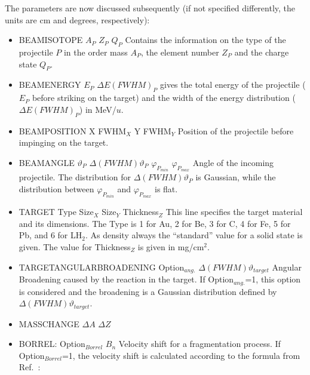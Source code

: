 \documentclass[12pt]{book}
\begin{document}
The parameters are now discussed subsequently (if not specified differently, 
the units are cm and degrees, respectively):\hfill{}
\begin{itemize}
\item BEAMISOTOPE $A_{P}$ $Z_{P}$ $Q_{P}$ \hfill{} \linebreak
  Contains the information on the type of the projectile $P$ in the order 
  mass $A_{P}$, the element number $Z_{P}$ and the charge state $Q_{P}$.
\item BEAMENERGY $E_{P}$ $\Delta E(FWHM)_{P}$\hfill{} \linebreak
  gives the total energy of the projectile 
  ( $E_{P}$ before striking on the target) 
  and the width of the energy distribution ($\Delta E(FWHM)_{P}$) in MeV/$u$.
\item BEAMPOSITION X FWHM$_{X}$ Y FWHM$_{Y}$\hfill{} \linebreak 
  Position of the projectile before impinging on the target. 
\item BEAMANGLE $\vartheta_{P}$ $\Delta (FWHM) \vartheta_{P}$ $\varphi_{P_{min}}$ $\varphi_{P_{max}}$
  \hfill{} \linebreak
  Angle of the incoming projectile. The distribution for $\Delta (FWHM) \vartheta_{P}$ is Gaussian, while the 
  distribution between $\varphi_{P_{min}}$ and $\varphi_{P_{max}}$ is flat.
\item TARGET Type Size$_{X}$ Size$_{Y}$ Thickness$_{Z}$\hfill{} \linebreak 
  This line specifies the target material and its dimensions. 
  The Type is 1 for Au, 2 for Be, 3 for C, 4 for Fe, 5 for Pb, and 6 for LH$_{2}$. 
  As density always the ``standard'' value for a solid state is given.
  The value for Thickness$_{Z}$ is given in mg/cm$^{2}$.
\item TARGETANGULARBROADENING Option$_{ang.}$ $\Delta (FWHM) \vartheta_{target}$\hfill{} \linebreak 
  Angular Broadening caused by the reaction in the target. If Option$_{ang.}$=1,
  this option is considered and the broadening is a Gaussian distribution defined by $\Delta (FWHM) \vartheta_{target}$.
\item MASSCHANGE $\Delta A$ $\Delta Z$\hfill{} \linebreak
\item BORREL: Option$_{Borrel}$ $B_{n}$\hfill{} \linebreak
  Velocity shift for a fragmentation process. If Option$_{Borrel}$=1, the velocity shift is calculated according
  to the formula from Ref.~\cite{BORREL}:

\end{itemize}
\end{document}
